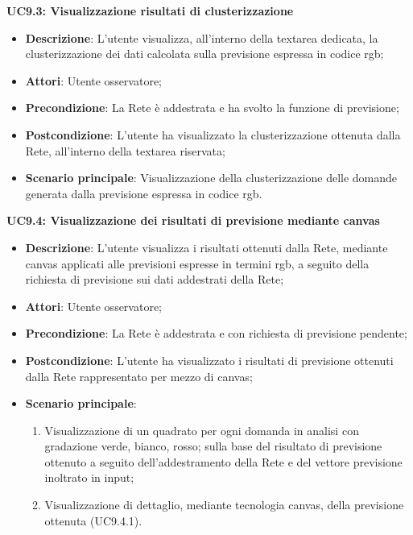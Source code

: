 \textbf{UC9.3: Visualizzazione risultati di clusterizzazione}\mbox{}
\label{UC9.3: Visualizzazione risultati di clusterizzazione}
\noindent
\begin{itemize}
\item \textbf{Descrizione}: L'utente visualizza, all'interno della textarea dedicata, la clusterizzazione dei dati calcolata sulla previsione espressa in codice rgb;
\item \textbf{Attori}: Utente osservatore;
\item \textbf{Precondizione}: La Rete \`e addestrata e ha svolto la funzione di previsione;
\item \textbf{Postcondizione}: L'utente ha visualizzato la clusterizzazione ottenuta dalla Rete, all'interno della textarea riservata;
\item \textbf{Scenario principale}: Visualizzazione della clusterizzazione delle domande generata dalla previsione espressa in codice rgb.
\end{itemize}

\textbf{UC9.4: Visualizzazione dei risultati di previsione mediante canvas}\mbox{}
\label{UC9.4: Visualizzazione dei risultati di previsione mediante canvas}
\noindent
\begin{itemize}
\item \textbf{Descrizione}: L'utente visualizza i risultati ottenuti dalla Rete, mediante canvas applicati alle previsioni espresse in termini rgb, a seguito della richiesta di previsione sui dati addestrati della Rete;
\item \textbf{Attori}: Utente osservatore;
\item \textbf{Precondizione}: La Rete \`e addestrata e con richiesta di previsione pendente;
\item \textbf{Postcondizione}: L'utente ha visualizzato i risultati di previsione ottenuti dalla Rete rappresentato per mezzo di canvas; 
\item \textbf{Scenario principale}:
\begin{enumerate}
\item Visualizzazione di un quadrato per ogni domanda in analisi con gradazione verde, bianco, rosso; sulla base del risultato di previsione ottenuto a seguito dell'addestramento della Rete e del vettore previsione inoltrato in input;
\item Visualizzazione di dettaglio, mediante tecnologia canvas, della previsione ottenuta (UC9.4.1). 
\end{enumerate}
\end{itemize}

